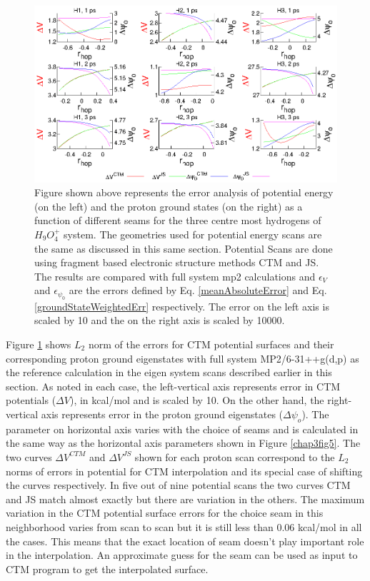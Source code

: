 \begin{figure}[htb!]
  \begin{center}
    \includegraphics[width=1\textwidth]{figures/autosubScanEigen.eps}
    \caption{\label{autosubScanEigen} Figure shown above represents the error analysis of potential energy (on the
    left) and the proton ground states (on the right) as a function of different seams for the three
    centre most hydrogens of $H_9O_4^+$ system. The geometries used for potential energy scans are the same as
    discussed in this same section. Potential Scans are done using fragment based electronic
    structure methods CTM and JS. The results are compared with full system mp2 calculations and $\epsilon_{V}$
    and $\epsilon_{\psi_{0}}$ are the errors defined by Eq. \ref{meanAbsoluteError} and
    Eq. \ref{groundStateWeightedErr} respectively. The error on the left axis is scaled by 10 and the on the
    right axis is scaled by 10000.
    }
  \end{center}
\end{figure}

Figure \ref{autosubScanEigen} shows $L_{2}$ norm of the errors for CTM potential surfaces and their corresponding
proton ground eigenstates with full system MP2/6-31++g(d,p) as the reference calculation in the eigen system scans
described earlier in this section. As noted in each case, the left-vertical axis represents error in CTM potentials
($\Delta V$), in kcal/mol and is scaled by 10. On the other hand, the right-vertical axis represents error in the
proton ground eigenstates ($\Delta \psi_{o}$). The parameter on horizontal axis varies with the choice of seams and
is calculated in the same way as the horizontal axis parameters shown in Figure \ref{chap3fig5}. The two
curves $\Delta V^{CTM}$ and $\Delta V^{JS}$ shown for each proton scan correspond to the $L_{2}$ norms of errors
in potential for CTM interpolation and its special case of shifting the curves respectively. In five out of nine
potential scans the two curves CTM and JS match almost exactly but there are variation in the others. The maximum
variation in the CTM potential surface errors for the choice seam in this neighborhood varies from scan
to scan but it is still less than 0.06 kcal/mol in all the cases. This means that the exact location of seam doesn't
play important role in the interpolation. An approximate guess for the seam can be used as
input to CTM program to get the interpolated surface.

